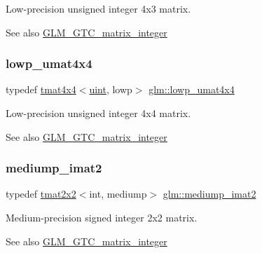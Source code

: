 Low-\/precision unsigned integer 4x3 matrix. \begin{DoxySeeAlso}{See also}
\hyperlink{group__gtc__matrix__integer}{G\+L\+M\+\_\+\+G\+T\+C\+\_\+matrix\+\_\+integer} 
\end{DoxySeeAlso}
\mbox{\label{group__gtc__matrix__integer_ga6ec13ea43b4328e29219f8515c188997}} 
\subsubsection{\texorpdfstring{lowp\+\_\+umat4x4}{lowp\_umat4x4}}
{\footnotesize\ttfamily typedef \hyperlink{structglm_1_1tmat4x4}{tmat4x4}$<$\hyperlink{group__core__precision_ga4fd29415871152bfb5abd588334147c8}{uint}, lowp$>$ \hyperlink{group__gtc__matrix__integer_ga6ec13ea43b4328e29219f8515c188997}{glm\+::lowp\+\_\+umat4x4}}

Low-\/precision unsigned integer 4x4 matrix. \begin{DoxySeeAlso}{See also}
\hyperlink{group__gtc__matrix__integer}{G\+L\+M\+\_\+\+G\+T\+C\+\_\+matrix\+\_\+integer} 
\end{DoxySeeAlso}
\mbox{\label{group__gtc__matrix__integer_gae812330b83568359273b6ec96b002863}} 
\subsubsection{\texorpdfstring{mediump\+\_\+imat2}{mediump\_imat2}}
{\footnotesize\ttfamily typedef \hyperlink{structglm_1_1tmat2x2}{tmat2x2}$<$int, mediump$>$ \hyperlink{group__gtc__matrix__integer_gae812330b83568359273b6ec96b002863}{glm\+::mediump\+\_\+imat2}}

Medium-\/precision signed integer 2x2 matrix. \begin{DoxySeeAlso}{See also}
\hyperlink{group__gtc__matrix__integer}{G\+L\+M\+\_\+\+G\+T\+C\+\_\+matrix\+\_\+integer} 
\end{DoxySeeAlso}
\mbox{\label{group__gtc__matrix__integer_ga52a40f2f95562746fd8084726a300963}} 
